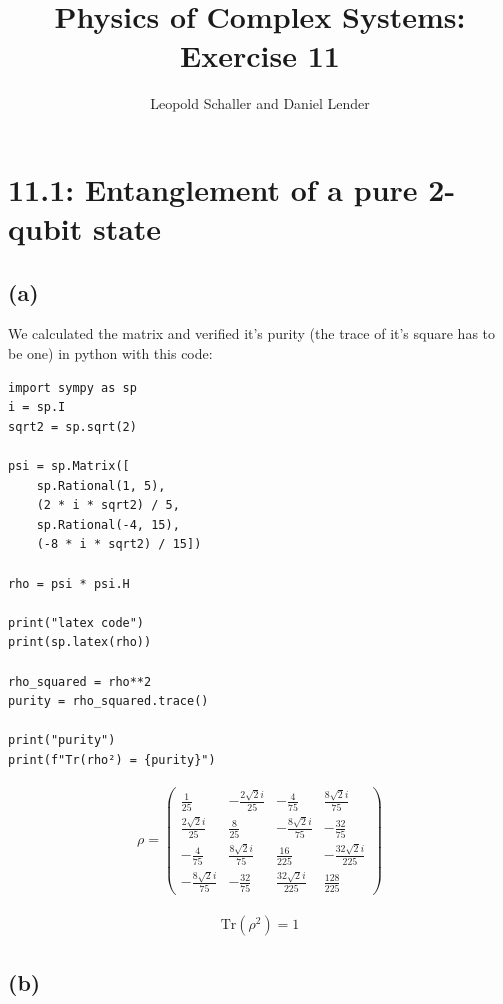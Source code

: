 \documentclass{article}
\title{Physics of Complex Systems: Exercise 11}
\author{Leopold Schaller and Daniel Lender}
\begin{document}
\maketitle

\section*{11.1: Entanglement of a pure 2-qubit state}
\subsection*{(a)}

We calculated the matrix and verified it's purity (the trace of it's square has to be one) in python with this code:

\begin{verbatim}
import sympy as sp
i = sp.I
sqrt2 = sp.sqrt(2)

psi = sp.Matrix([
    sp.Rational(1, 5),
    (2 * i * sqrt2) / 5,
    sp.Rational(-4, 15),
    (-8 * i * sqrt2) / 15])

rho = psi * psi.H

print("latex code")
print(sp.latex(rho))

rho_squared = rho**2
purity = rho_squared.trace()

print("purity")
print(f"Tr(rho²) = {purity}")
\end{verbatim}

\begin{align}
\rho=
    \begin{pmatrix}
    \frac{1}{25} & - \frac{2 \sqrt{2} i}{25} & - \frac{4}{75} & \frac{8 \sqrt{2} i}{75}\\[0.1cm]
    \frac{2 \sqrt{2} i}{25} & \frac{8}{25} & - \frac{8 \sqrt{2} i}{75} & - \frac{32}{75}\\[0.1cm]
    - \frac{4}{75} & \frac{8 \sqrt{2} i}{75} & \frac{16}{225} & - \frac{32 \sqrt{2} i}{225}\\[0.1cm]
    - \frac{8 \sqrt{2} i}{75} & - \frac{32}{75} & \frac{32 \sqrt{2} i}{225} & \frac{128}{225}
    \end{pmatrix}
\end{align}

\begin{align}
    \text{Tr}(\rho^2)=1
\end{align}
\subsection*{(b)}
\end{document}
